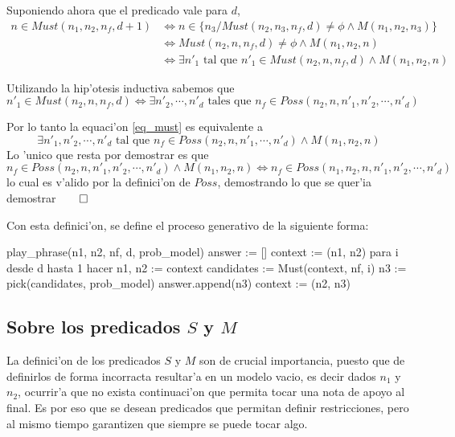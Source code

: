 Suponiendo ahora que el predicado vale para $d$, 
\begin{align}
n \in Must(n_1, n_2, n_f, d+1)   & \Leftrightarrow n \in \{n_3/ Must(n_2, n_3, n_f, d) \neq \phi \land M(n_1,n_2, n_3)\} \nonumber \\
                                 & \Leftrightarrow Must(n_2, n, n_f, d) \neq \phi \land M(n_1,n_2, n) \nonumber \\
                                 & \Leftrightarrow \exists n'_1 \text{ tal que } n'_1 \in Must(n_2, n, n_f, d) \land M(n_1,n_2, n) \label{eq_must}
\end{align}

Utilizando la hip'otesis inductiva sabemos que 
$$  n'_1 \in Must(n_2, n, n_f, d) \Leftrightarrow \exists n'_2, \cdots, n'_{d} \text{ tales que } n_f \in Poss(n_2, n, n'_1, n'_2, \cdots, n'_{d})$$

Por lo tanto la equaci'on \ref{eq_must} es equivalente a
$$ \exists n'_1, n'_2, \cdots, n'_d \text{ tal que } n_f \in Poss(n_2, n, n'_1, \cdots, n'_d) \land M(n_1,n_2, n) $$
Lo 'unico que resta por demostrar es que 
$$ n_f \in Poss(n_2, n, n'_1, n'_2, \cdots, n'_d) \land M(n_1,n_2, n) \Leftrightarrow n_f \in Poss(n_1, n_2, n, n'_1, n'_2, \cdots, n'_d)$$
lo cual es v'alido por la definici'on de $Poss$, demostrando lo que se quer'ia demostrar$\qed$


Con esta definici'on, se define el proceso generativo de la siguiente forma:

\begin{algoritmo}
play_phrase(n1, n2, nf, d, prob_model)
    answer := []
    context := (n1, n2)
    para i desde d hasta 1 hacer
        n1, n2 := context
        candidates := Must(context, nf, i)
        n3 := pick(candidates, prob_model)
        answer.append(n3)
        context := (n2, n3) 
\end{algoritmo}





\subsection{Sobre los predicados $S$ y $M$}
\label{sec:must_predicates}
La definici'on de los predicados $S$ y $M$ son de crucial importancia, puesto que de definirlos de forma incorracta resultar'a en un modelo vacio, 
es decir dados $n_1$ y $n_2$, ocurrir'a que no exista continuaci'on que permita tocar una nota de apoyo al final. 
Es por eso que se desean predicados que permitan definir restricciones, pero al mismo tiempo garantizen que siempre se puede tocar algo.

